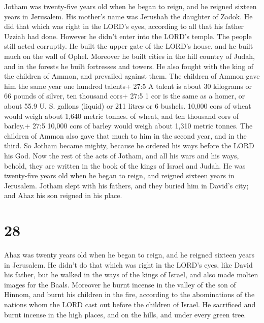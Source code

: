  Jotham was twenty-five years old when he began to reign,
and he reigned sixteen years in Jerusalem. His mother's name was
Jerushah the daughter of Zadok.  He did that which was right
in the LORD's eyes, according to all that his father Uzziah had done.
However he didn't enter into the LORD's temple. The people still acted
corruptly.  He built the upper gate of the LORD's house, and
he built much on the wall of Ophel.  Moreover he built
cities in the hill country of Judah, and in the forests he built
fortresses and towers.  He also fought with the king of the
children of Ammon, and prevailed against them. The children of Ammon
gave him the same year one hundred talents+ 27:5 A talent is about 30
kilograms or 66 pounds of silver, ten thousand cors+ 27:5 1 cor is the
same as a homer, or about 55.9 U. S. gallons (liquid) or 211 litres or 6
bushels. 10,000 cors of wheat would weigh about 1,640 metric tonnes. of
wheat, and ten thousand cors of barley.+ 27:5 10,000 cors of barley
would weigh about 1,310 metric tonnes. The children of Ammon also gave
that much to him in the second year, and in the third.  So
Jotham became mighty, because he ordered his ways before the LORD his
God.  Now the rest of the acts of Jotham, and all his wars
and his ways, behold, they are written in the book of the kings of
Israel and Judah.  He was twenty-five years old when he
began to reign, and reigned sixteen years in Jerusalem. 
Jotham slept with his fathers, and they buried him in David's city; and
Ahaz his son reigned in his place.

\hypertarget{section-27}{%
\section{28}\label{section-27}}

 Ahaz was twenty years old when he began to reign, and he
reigned sixteen years in Jerusalem. He didn't do that which was right in
the LORD's eyes, like David his father,  but he walked in
the ways of the kings of Israel, and also made molten images for the
Baals.  Moreover he burnt incense in the valley of the son
of Hinnom, and burnt his children in the fire, according to the
abominations of the nations whom the LORD cast out before the children
of Israel.  He sacrificed and burnt incense in the high
places, and on the hills, and under every green tree.

